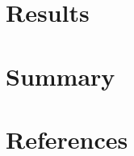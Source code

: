 \documentclass[reprint,NumberedRefs]{JASA}
\begin{document}
\section{Results}
\label{sec:results}

\section{Summary}
\label{sec:summary}




\section{References}




\end{document}
